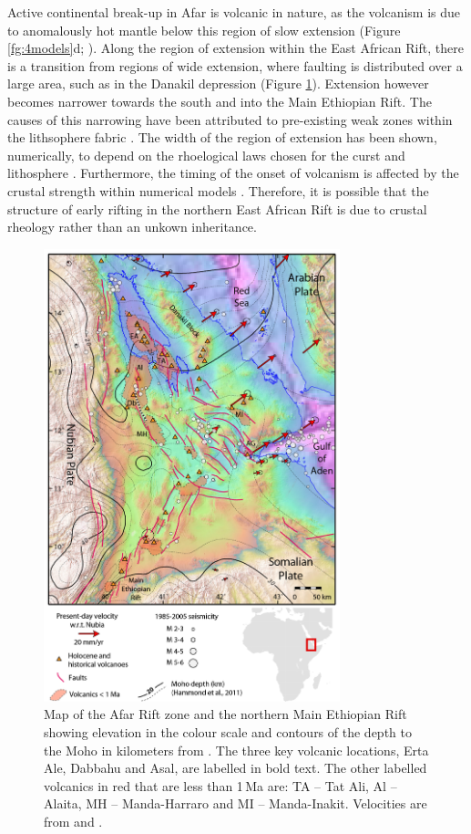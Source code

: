 Active continental break-up in Afar is volcanic in nature, as the volcanism is due to anomalously hot mantle below this region of slow extension (Figure \ref{fg:4models}d; \citealp{armitage-etal-epsl-2015}). Along the region of extension within the East African Rift, there is a transition from regions of wide extension, where faulting is distributed over a large area, such as in the Danakil depression (Figure \ref{fg:afar-map}). Extension however becomes narrower towards the south and into the Main Ethiopian Rift. The causes of this narrowing have been attributed to pre-existing weak zones within the lithsophere fabric \citep{karenan-etal-2009}. The width of the region of extension has been shown, numerically, to depend on the rhoelogical laws chosen for the curst and lithosphere \citep[e.g.][]{buck-1991,brun-1999,brune-etal-2017}. Furthermore, the timing of the onset of volcanism is affected by the crustal strength within numerical models \citep{ros-etal-2017}. Therefore, it is possible that the structure of early rifting in the northern East African Rift is due to crustal rheology rather than an unkown inheritance.

\begin{figure}
\centering
\includegraphics[width=8.6cm]{./figures/ch2-afar-map.png}
\caption{Map of the Afar Rift zone and the northern Main Ethiopian Rift showing elevation in the colour scale and contours of the depth to the Moho in kilometers from \cite{hammond-etal-2011}. The three key volcanic locations, Erta Ale, Dabbahu and Asal, are labelled in bold text. The other labelled volcanics in red that are less than 1\,Ma are: TA – Tat Ali, Al – Alaita, MH – Manda-Harraro and MI – Manda-Inakit. Velocities are from \cite{nooner-etal-2009} and \cite{reilinger-2011}.}
\label{fg:afar-map}
\end{figure}

